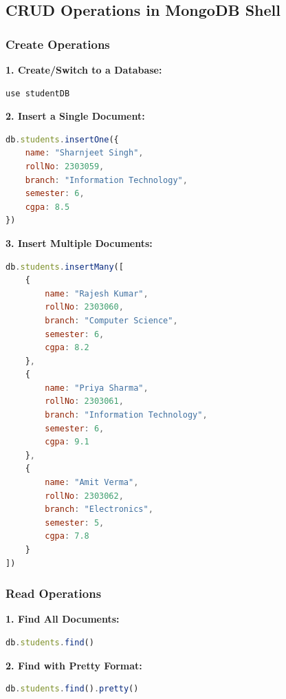 \documentclass[12pt,a4paper]{article}
\begin{document}
\subsection{CRUD Operations in MongoDB Shell}

\subsubsection{Create Operations}

\textbf{1. Create/Switch to a Database:}

\begin{lstlisting}[language=bash]
use studentDB
\end{lstlisting}

\textbf{2. Insert a Single Document:}

\begin{lstlisting}[language=JavaScript]
db.students.insertOne({
    name: "Sharnjeet Singh",
    rollNo: 2303059,
    branch: "Information Technology",
    semester: 6,
    cgpa: 8.5
})
\end{lstlisting}

\textbf{3. Insert Multiple Documents:}

\begin{lstlisting}[language=JavaScript]
db.students.insertMany([
    {
        name: "Rajesh Kumar",
        rollNo: 2303060,
        branch: "Computer Science",
        semester: 6,
        cgpa: 8.2
    },
    {
        name: "Priya Sharma",
        rollNo: 2303061,
        branch: "Information Technology",
        semester: 6,
        cgpa: 9.1
    },
    {
        name: "Amit Verma",
        rollNo: 2303062,
        branch: "Electronics",
        semester: 5,
        cgpa: 7.8
    }
])
\end{lstlisting}

\subsubsection{Read Operations}

\textbf{1. Find All Documents:}

\begin{lstlisting}[language=JavaScript]
db.students.find()
\end{lstlisting}

\textbf{2. Find with Pretty Format:}

\begin{lstlisting}[language=JavaScript]
db.students.find().pretty()
\end{lstlisting}
\end{document}
